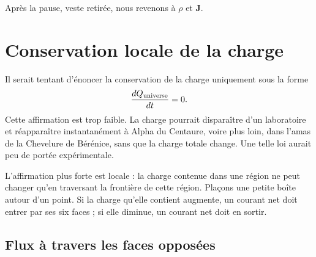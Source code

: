 \begin{classroomqa}
\end{classroomqa}

Après la pause, veste retirée, nous revenons à \(\rho\) et \(\mathbf J\).

\section{Conservation locale de la charge}

Il serait tentant d’énoncer la conservation de la charge uniquement sous la forme
\begin{equation}
\frac{dQ_{\rm universe}}{dt}=0.
\end{equation}
Cette affirmation est trop faible. La charge pourrait disparaître d’un laboratoire et réapparaître instantanément à Alpha du Centaure, voire plus loin, dans l’amas de la Chevelure de Bérénice, sans que la charge totale change. Une telle loi aurait peu de portée expérimentale.

L’affirmation plus forte est locale : la charge contenue dans une région ne peut changer qu’en traversant la frontière de cette région. Plaçons une petite boîte autour d’un point. Si la charge qu’elle contient augmente, un courant net doit entrer par ses six faces ; si elle diminue, un courant net doit en sortir.

\subsection{Flux à travers les faces opposées}

